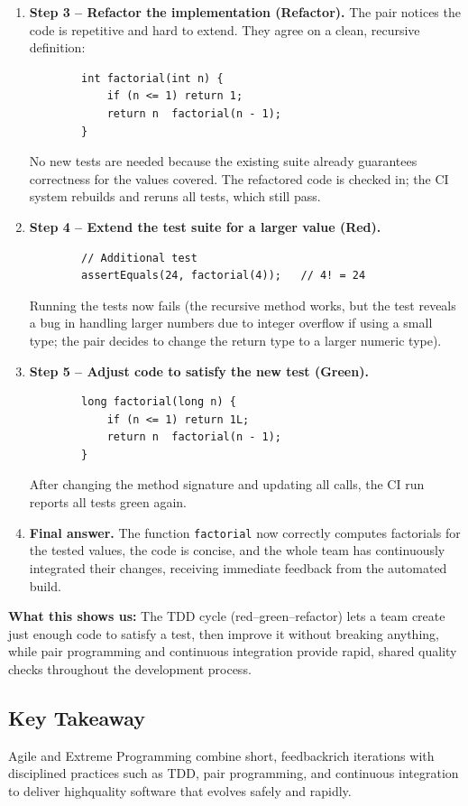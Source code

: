 \documentclass[12pt, a4paper]{article}
\begin{document}
\begin{enumerate}
  \item \textbf{Step 3 -- Refactor the implementation (Refactor).}
        The pair notices the code is repetitive and hard to extend. They agree on a clean, recursive definition:
        \begin{verbatim}
        int factorial(int n) {
            if (n <= 1) return 1;
            return n  factorial(n - 1);
        }
        \end{verbatim}
        No new tests are needed because the existing suite already guarantees correctness for the values covered. The refactored code is checked in; the CI system rebuilds and reruns all tests, which still pass.

  \item \textbf{Step 4 -- Extend the test suite for a larger value (Red).}
        \begin{verbatim}
        // Additional test
        assertEquals(24, factorial(4));   // 4! = 24
        \end{verbatim}
        Running the tests now fails (the recursive method works, but the test reveals a bug in handling larger numbers due to integer overflow if using a small type; the pair decides to change the return type to a larger numeric type).

  \item \textbf{Step 5 -- Adjust code to satisfy the new test (Green).}
        \begin{verbatim}
        long factorial(long n) {
            if (n <= 1) return 1L;
            return n  factorial(n - 1);
        }
        \end{verbatim}
        After changing the method signature and updating all calls, the CI run reports all tests green again.

  \item \textbf{Final answer.}
        The function \verb|factorial| now correctly computes factorials for the tested values, the code is concise, and the whole team has continuously integrated their changes, receiving immediate feedback from the automated build.
\end{enumerate}
\textbf{What this shows us:} The TDD cycle (red--green--refactor) lets a team create just enough code to satisfy a test, then improve it without breaking anything, while pair programming and continuous integration provide rapid, shared quality checks throughout the development process.

\subsection{Key Takeaway}
Agile and Extreme Programming combine short, feedbackrich iterations with disciplined practices such as TDD, pair programming, and continuous integration to deliver highquality software that evolves safely and rapidly.
\end{document}
